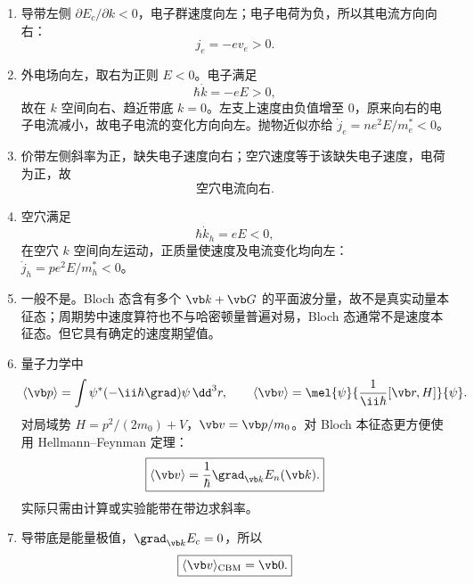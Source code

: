 \begin{question}[20 分]
\begin{solution}
\begin{enumerate}
  \item 导带左侧 $\partial E_c/\partial k<0$，电子群速度向左；电子电荷为负，所以其电流方向向右：
  \[
    \boxed{j_e=-ev_e>0.}
  \]
  \item 外电场向左，取右为正则 $E<0$。电子满足
  \[
    \hbar\dot k=-eE>0,
  \]
  故在 $k$ 空间向右、趋近带底 $k=0$。左支上速度由负值增至 0，原来向右的电子电流减小，故电子电流的变化方向向左。抛物近似亦给
  $\dot j_e=ne^2E/m_e^*<0$。
  \item 价带左侧斜率为正，缺失电子速度向右；空穴速度等于该缺失电子速度，电荷为正，故
  \[
    \boxed{\text{空穴电流向右}.}
  \]
  \item 空穴满足
  \[
    \hbar\dot k_h=eE<0,
  \]
  在空穴 $k$ 空间向左运动，正质量使速度及电流变化均向左：
  $\dot j_h=pe^2E/m_h^*<0$。
  \item 一般不是。Bloch 态含有多个 $\vb k+\vb G$ 的平面波分量，故不是真实动量本征态；周期势中速度算符也不与哈密顿量普遍对易，Bloch 态通常不是速度本征态。但它具有确定的速度期望值。
  \item 量子力学中
  \[
    \langle\vb p\rangle=\int\psi^*(-\ii\hbar\grad)\psi\,\dd^3r,
    \qquad
    \langle\vb v\rangle=\mel{\psi}{\frac1{\ii\hbar}[\vb r,H]}{\psi}.
  \]
  对局域势 $H=p^2/(2m_0)+V$，$\vb v=\vb p/m_0$。对 Bloch 本征态更方便使用 Hellmann--Feynman 定理：
  \[
    \boxed{\langle\vb v\rangle=\frac1\hbar\grad_{\vb k}E_n(\vb k).}
  \]
  实际只需由计算或实验能带在带边求斜率。
  \item 导带底是能量极值，$\grad_{\vb k}E_c=0$，所以
  \[
    \boxed{\langle\vb v\rangle_{\rm CBM}=\vb0.}
  \]
\end{enumerate}
\end{solution}
\end{question}
